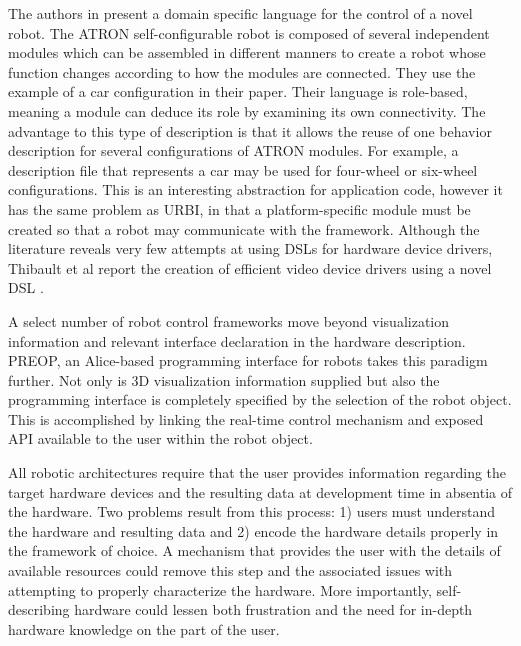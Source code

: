 The authors in \cite{Schultz2007} present a domain specific language for the control of a novel robot. The ATRON self-configurable robot is composed of several independent modules which can be assembled in different manners to create a robot whose function changes according to how the modules are connected. They use the example of a car configuration in their paper. Their language is role-based, meaning a module can deduce its role by examining its own connectivity. The advantage to this type of description is that it allows the reuse of one behavior description for several configurations of ATRON modules. For example, a description file that represents a car may be used for four-wheel or six-wheel configurations. This is an interesting abstraction for application code, however it has the same problem as URBI, in that a platform-specific module must be created so that a robot may communicate with the framework.  Although the literature reveals very few attempts at using DSLs for hardware device drivers, Thibault et al report the creation of efficient video device drivers using a novel DSL \cite{Thibault1999}.  

A select number of robot control frameworks move beyond visualization information and relevant interface declaration in the hardware description.  PREOP, an Alice-based programming interface \cite{cooper2000,Wellman2009,Anderson} for robots takes this paradigm further.  Not only is 3D visualization information supplied but also the programming interface is completely specified by the selection of the robot object.  This is accomplished by linking the real-time control mechanism and exposed API available to the user within the robot object.  

All robotic architectures require that the user provides information regarding the target hardware devices and the resulting data at development time in absentia of the hardware.  Two problems result from this process: 1) users must understand the hardware and resulting data and 2) encode the hardware details properly in the framework of choice.   A mechanism that provides the user with the details of available resources could remove this step and the associated issues with attempting to properly characterize the hardware.  More importantly, self-describing hardware could lessen both frustration and the need for in-depth hardware knowledge on the part of the user.  

